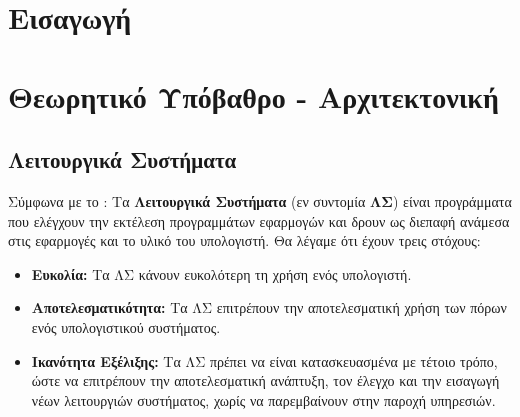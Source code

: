 \documentclass{report}
\begin{document}
\chapter{Εισαγωγή}
\newpage

\chapter{Θεωρητικό Υπόβαθρο - Αρχιτεκτονική}

\section{Λειτουργικά Συστήματα}
Σύμφωνα με το \cite{stallings}: Τα \textbf{Λειτουργικά Συστήματα} (εν συντομία \textbf{ΛΣ}) είναι προγράμματα που ελέγχουν την εκτέλεση προγραμμάτων εφαρμογών και δρουν ως διεπαφή ανάμεσα στις εφαρμογές και το υλικό του υπολογιστή. Θα λέγαμε ότι έχουν τρεις στόχους:
\begin{itemize}
    \item \textbf{Ευκολία:} Τα ΛΣ κάνουν ευκολότερη τη χρήση ενός υπολογιστή.
    \item \textbf{Αποτελεσματικότητα:} Τα ΛΣ επιτρέπουν την αποτελεσματική χρήση των πόρων ενός υπολογιστικού συστήματος.
    \item \textbf{Ικανότητα Εξέλιξης:} Τα ΛΣ πρέπει να είναι κατασκευασμένα με τέτοιο τρόπο, ώστε να επιτρέπουν την αποτελεσματική ανάπτυξη, τον έλεγχο και την εισαγωγή νέων λειτουργιών συστήματος, χωρίς να παρεμβαίνουν στην παροχή υπηρεσιών.
\end{itemize}
\end{document}
